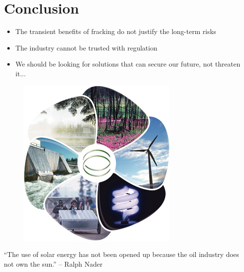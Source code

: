 \documentclass[pdf]{beamer}
\begin{document}
\section{Conclusion}
\begin{frame}
	\begin{itemize}
		\item The transient benefits of fracking do not justify the long-term risks
		\item The industry cannot be trusted with regulation
		\item We should be looking for solutions that can secure our future, not threaten it...
	\end{itemize}
\end{frame}
\begin{frame}
	\begin{figure}
		\includegraphics[scale=1]{renewable.jpg}
	\end{figure}
\end{frame}
\begin{frame}
	``The use of solar energy has not been opened up because the oil industry does not own the sun.''
	 -- Ralph Nader
\end{frame}
\end{document}
